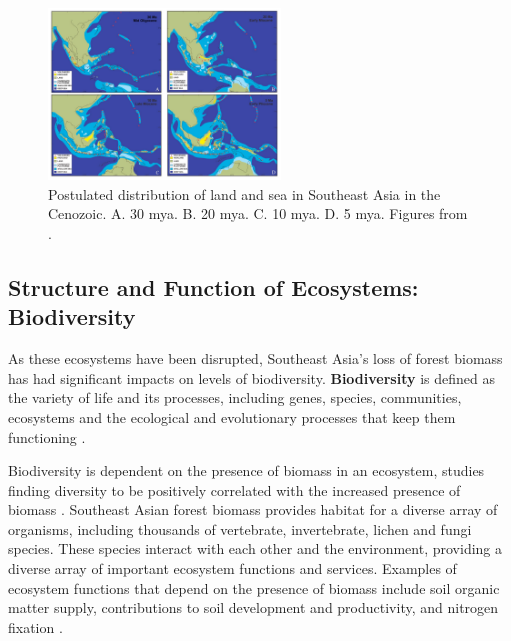    \begin{figure}[ht]
    \centering
        \includegraphics[width = 0.55\textwidth]{graphics/geology.jpg}
        \caption{Postulated distribution of land and sea in Southeast Asia in the Cenozoic. A. 30 mya. B. 20 mya. C. 10 mya. D. 5 mya. Figures from \cite{hall2002cenozoic}.}
    \end{figure} 

\subsection{Structure and Function of Ecosystems: Biodiversity}

 As these ecosystems have been disrupted, Southeast Asia's loss of forest biomass has had significant impacts on levels of biodiversity. \textbf{Biodiversity} is defined as the variety of life and its processes, including genes, species, communities, ecosystems and the ecological and evolutionary processes that keep them functioning \citep{noss1994saving}. 
 
 Biodiversity is dependent on the presence of biomass in an ecosystem, studies finding diversity to be positively correlated with the increased presence of biomass \citep{cardinale2007impacts}. Southeast Asian forest biomass provides habitat for a diverse array of organisms, including thousands of vertebrate, invertebrate, lichen and fungi species. These species interact with each other and the environment, providing a diverse array of important ecosystem functions and services. Examples of ecosystem functions that depend on the presence of biomass include soil organic matter supply, contributions to soil development and productivity, and nitrogen fixation \citep{humphrey1999relationships}.
 

